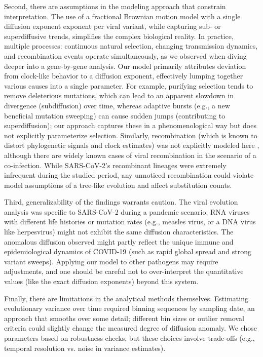 Second, there are assumptions in the modeling approach that constrain interpretation. The use of a fractional Brownian motion model with a single diffusion exponent exponent per viral variant, while capturing sub- or superdiffusive trends, simplifies the complex biological reality. In practice, multiple processes: continuous natural selection, changing transmission dynamics, and recombination events operate simultaneously, as we observed when diving deeper into a gene-by-gene analysis. Our model primarily attributes deviation from clock-like behavior to a diffusion exponent, effectively lumping together various causes into a single parameter. For example, purifying selection tends to remove deleterious mutations, which can lead to an apparent slowdown in divergence (subdiffusion) over time, whereas adaptive bursts (e.g., a new beneficial mutation sweeping) can cause sudden jumps (contributing to superdiffusion); our approach captures these in a phenomenological way but does not explicitly parameterize selection. Similarly, recombination (which is known to distort phylogenetic signals and clock estimates) was not explicitly modeled here \cite{Holmes1999}, although there are widely known cases of viral recombination in the scenario of a co-infection. While SARS-CoV-2's recombinant lineages were extremely infrequent during the studied period, any unnoticed recombination could violate model assumptions of a tree-like evolution and affect substitution counts.

Third, generalizability of the findings warrants caution. The viral evolution analysis was specific to SARS-CoV-2 during a pandemic scenario; RNA viruses with different life histories or mutation rates (e.g., measles virus, or a DNA virus like herpesvirus) might not exhibit the same diffusion characteristics. The anomalous diffusion observed might partly reflect the unique immune and epidemiological dynamics of COVID-19 (such as rapid global spread and strong variant sweeps). Applying our model to other pathogens may require adjustments, and one should be careful not to over-interpret the quantitative values (like the exact diffusion exponents) beyond this system.

Finally, there are limitations in the analytical methods themselves. Estimating evolutionary variance over time required binning sequences by sampling date, an approach that smooths over some detail; different bin sizes or outlier removal criteria could slightly change the measured degree of diffusion anomaly. We chose parameters based on robustness checks, but these choices involve trade-offs (e.g., temporal resolution vs. noise in variance estimates). 

